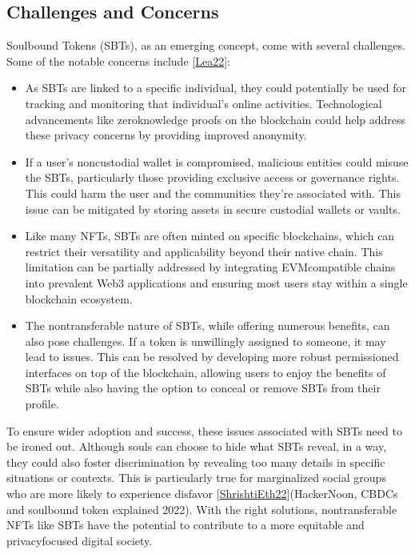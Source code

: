 \documentclass[letterpaper,10pt,english]{jupyterBook}
\begin{document}
\subsection{Challenges and Concerns}
\label{\detokenize{SBT/SBT:challenges-and-concerns}}
\sphinxAtStartPar
Soulbound Tokens (SBTs), as an emerging concept, come with several challenges. Some of the notable concerns include {[}\hyperlink{cite.SBT/SBT:id88}{Lea22}{]}:
\begin{itemize}
\item {} 
\sphinxAtStartPar
{} As SBTs are linked to a specific individual, they could potentially be used for tracking and monitoring that individual’s online activities. Technological advancements like zero\sphinxhyphen{}knowledge proofs on the blockchain could help address these privacy concerns by providing improved anonymity.

\item {} 
\sphinxAtStartPar
{} If a user’s non\sphinxhyphen{}custodial wallet is compromised, malicious entities could misuse the SBTs, particularly those providing exclusive access or governance rights. This could harm the user and the communities they’re associated with. This issue can be mitigated by storing assets in secure custodial wallets or vaults.

\item {} 
\sphinxAtStartPar
{} Like many NFTs, SBTs are often minted on specific blockchains, which can restrict their versatility and applicability beyond their native chain. This limitation can be partially addressed by integrating EVM\sphinxhyphen{}compatible chains into prevalent Web3 applications and ensuring most users stay within a single blockchain ecosystem.

\item {} 
\sphinxAtStartPar
{} The non\sphinxhyphen{}transferable nature of SBTs, while offering numerous benefits, can also pose challenges. If a token is unwillingly assigned to someone, it may lead to issues. This can be resolved by developing more robust permissioned interfaces on top of the blockchain, allowing users to enjoy the benefits of SBTs while also having the option to conceal or remove SBTs from their profile.

\end{itemize}

\sphinxAtStartPar
To ensure wider adoption and success, these issues associated with SBTs need to be ironed out. Although souls can choose to hide what SBTs reveal, in a way, they could also foster discrimination by revealing too many details in specific situations or contexts. This is particularly true for marginalized social groups who are more likely to experience disfavor {[}\hyperlink{cite.SBT/SBT:id87}{ShrishtiEth22}{]}(HackerNoon, CBDCs and soulbound token explained 2022). With the right solutions, non\sphinxhyphen{}transferable NFTs like SBTs have the potential to contribute to a more equitable and privacy\sphinxhyphen{}focused digital society.
\end{document}
